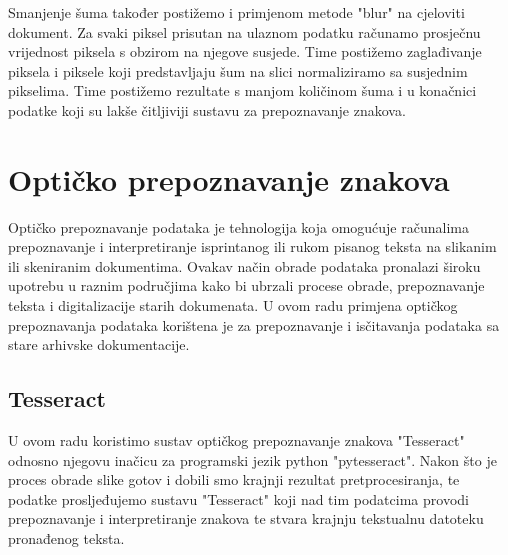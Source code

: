 \documentclass[times, utf8, zavrsni, numeric]{fer}
\begin{document}
Smanjenje šuma također postižemo i primjenom metode "blur" na cjeloviti dokument. Za svaki piksel prisutan na ulaznom podatku računamo prosječnu vrijednost piksela s obzirom na njegove susjede. Time postižemo zaglađivanje piksela i piksele koji predstavljaju šum na slici normaliziramo sa susjednim pikselima. Time postižemo rezultate s manjom količinom šuma i u konačnici podatke koji su lakše čitljiviji sustavu za prepoznavanje znakova.

\section{Optičko prepoznavanje znakova}
Optičko prepoznavanje podataka je tehnologija koja omogućuje računalima prepoznavanje i interpretiranje isprintanog ili rukom pisanog teksta na slikanim ili skeniranim dokumentima. Ovakav način obrade podataka pronalazi široku upotrebu u raznim područjima kako bi ubrzali procese obrade, prepoznavanje teksta i digitalizacije starih dokumenata.
U ovom radu primjena optičkog prepoznavanja podataka korištena je za prepoznavanje i isčitavanja podataka sa stare arhivske dokumentacije.

\subsection{Tesseract}
U ovom radu koristimo sustav optičkog prepoznavanje znakova "Tesseract" odnosno njegovu inačicu za programski jezik python "pytesseract". Nakon što je proces obrade slike gotov i dobili smo krajnji rezultat pretprocesiranja, te podatke prosljeđujemo sustavu "Tesseract" koji nad tim podatcima provodi prepoznavanje i interpretiranje znakova te stvara krajnju tekstualnu datoteku pronađenog teksta. 
\\
\end{document}
